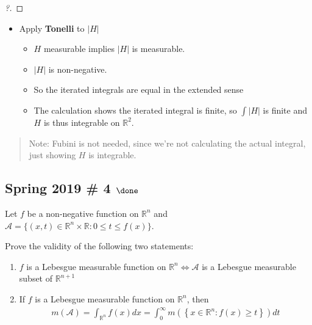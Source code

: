 \begin{solution}
\begin{proof}[?]
\end{proof}

\begin{itemize}
\tightlist
\item
  Apply \textbf{Tonelli} to \({\left\lvert {H} \right\rvert}\)

  \begin{itemize}
  \tightlist
  \item
    \(H\) measurable implies \({\left\lvert {H} \right\rvert}\) is
    measurable.
  \item
    \({\left\lvert {H} \right\rvert}\) is non-negative.
  \item
    So the iterated integrals are equal in the extended sense
  \item
    The calculation shows the iterated integral is finite, so
    \(\int {\left\lvert {H} \right\rvert}\) is finite and \(H\) is thus
    integrable on \({\mathbb{R}}^2\).
  \end{itemize}
\end{itemize}

\begin{quote}
Note: Fubini is not needed, since we're not calculating the actual
integral, just showing \(H\) is integrable.
\end{quote}

\end{solution}

\hypertarget{spring-2019-4-done}{%
\subsection{\texorpdfstring{Spring 2019 \# 4
\(\done\)}{Spring 2019 \# 4 \textbackslash done}}\label{spring-2019-4-done}}

Let \(f\) be a non-negative function on \({\mathbb{R}}^n\) and
\(\mathcal A = \{(x, t) ∈ {\mathbb{R}}^n \times {\mathbb{R}}: 0 ≤ t ≤ f (x)\}\).

Prove the validity of the following two statements:

\begin{enumerate}
\def\labelenumi{\alph{enumi}.}
\item
  \(f\) is a Lebesgue measurable function on
  \({\mathbb{R}}^n \iff \mathcal A\) is a Lebesgue measurable subset of
  \({\mathbb{R}}^{n+1}\)
\item
  If \(f\) is a Lebesgue measurable function on \({\mathbb{R}}^n\), then
  \begin{align*}
  m(\mathcal{A})=\int _{{\mathbb{R}}^{n}} f(x) d x=\int_{0}^{\infty} m\left(\left\{x \in {\mathbb{R}}^{n}: f(x) \geq t\right\}\right) dt
  \end{align*}
\end{enumerate}

